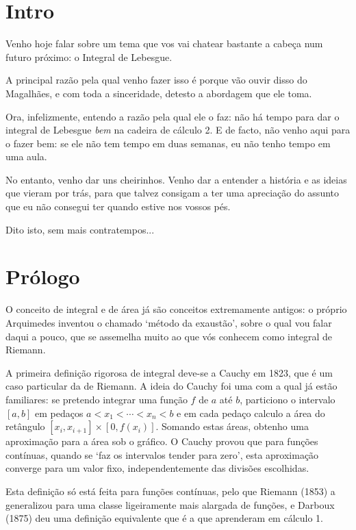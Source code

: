 \documentclass{article}
\title{}
\author{}
\begin{document}
\maketitle

\section{Intro}

Venho hoje falar sobre um tema que vos vai chatear bastante a cabeça num futuro próximo: o Integral de Lebesgue.

A principal razão pela qual venho fazer isso é porque vão ouvir disso do Magalhães, e com toda a sinceridade, detesto a abordagem que ele toma.

Ora, infelizmente, entendo a razão pela qual ele o faz: não há tempo para dar o integral de Lebesgue \emph{bem} na cadeira de cálculo 2. E de facto, não venho aqui para o fazer bem: se ele não tem tempo em duas semanas, eu não tenho tempo em uma aula.

No entanto, venho dar uns cheirinhos. Venho dar a entender a história e as ideias que vieram por trás, para que talvez consigam a ter uma apreciação do assunto que eu não consegui ter quando estive nos vossos pés.

Dito isto, sem mais contratempos...

\section{Prólogo}

O conceito de integral e de área já são conceitos extremamente antigos: o próprio Arquimedes inventou o chamado `método da exaustão', sobre o qual vou falar daqui a pouco, que se assemelha muito ao que vós conhecem como integral de Riemann.

A primeira definição rigorosa de integral deve-se a Cauchy em 1823, que é um caso particular da de Riemann. A ideia do Cauchy foi uma com a qual já estão familiares: se pretendo integrar uma função $f$ de $a$ até $b$, particiono o intervalo $[a,b]$ em pedaços $a < x_1 < \cdots < x_n < b$ e em cada pedaço calculo a área do retângulo $[x_i, x_{i+1}] \times [0, f(x_i)]$. Somando estas áreas, obtenho uma aproximação para a área sob o gráfico. O Cauchy provou que para funções contínuas, quando se `faz os intervalos tender para zero', esta aproximação converge para um valor fixo, independentemente das divisões escolhidas.

Esta definição só está feita para funções contínuas, pelo que Riemann (1853) a generalizou para uma classe ligeiramente mais alargada de funções, e Darboux (1875) deu uma definição equivalente que é a que aprenderam em cálculo 1.
\end{document}
